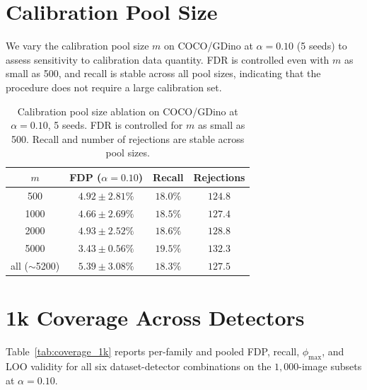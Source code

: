 \documentclass{article}
\theoremstyle{remark}
\newcommand{\1}{\mathbf{1}}
\begin{document}
\section{Calibration Pool Size}
\label{app:cal_size}

We vary the calibration pool size $m$ on COCO/GDino at $\alpha=0.10$ (5 seeds)
to assess sensitivity to calibration data quantity. FDR is controlled even with
$m$ as small as 500, and recall is stable across all pool sizes, indicating
that the procedure does not require a large calibration set.

\begin{table}[h]
\centering
\small
\begin{tabular}{cccc}
\toprule
$m$ & FDP ($\alpha\!=\!0.10$) & Recall & Rejections \\
\midrule
500  & $4.92 \pm 2.81\%$ & $18.0\%$ & $124.8$ \\
1000 & $4.66 \pm 2.69\%$ & $18.5\%$ & $127.4$ \\
2000 & $4.93 \pm 2.52\%$ & $18.6\%$ & $128.8$ \\
5000 & $3.43 \pm 0.56\%$ & $19.5\%$ & $132.3$ \\
all ($\sim$5200) & $5.39 \pm 3.08\%$ & $18.3\%$ & $127.5$ \\
\bottomrule
\end{tabular}
\caption{Calibration pool size ablation on COCO/GDino at $\alpha=0.10$,
5 seeds. FDR is controlled for $m$ as small as 500. Recall and
number of rejections are stable across pool sizes.}
\label{tab:cal_size}
\end{table}

\section{1k Coverage Across Detectors}
\label{app:coverage_1k}

Table~\ref{tab:coverage_1k} reports per-family and pooled FDP, recall,
$\phi_{\max}$, and LOO validity for all six dataset-detector combinations
on the $1{,}000$-image subsets at $\alpha\!=\!0.10$.
\end{document}
